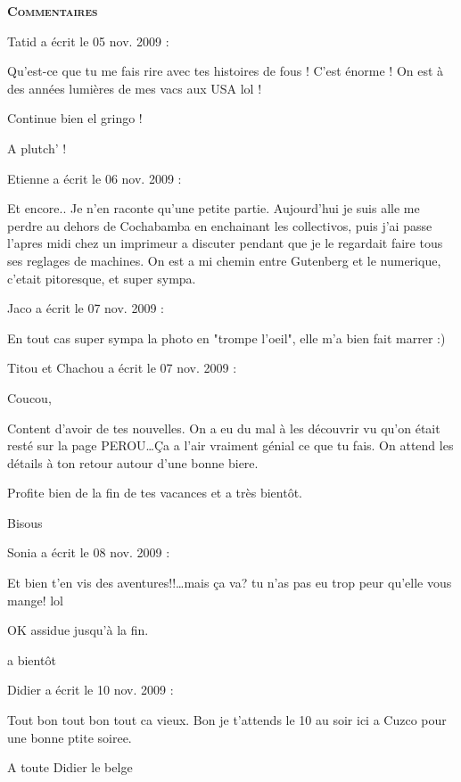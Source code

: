 \bigskip
\textbf{\textsc{Commentaires}}

\medskip
Tatid a écrit le 05 nov. 2009 :
\begin{displayquote}
Qu'est-ce que tu me fais rire avec tes histoires de fous ! C'est énorme ! On est à des années lumières de mes vacs aux USA lol !

Continue bien el gringo !

A plutch' !
\end{displayquote}

\medskip
Etienne a écrit le 06 nov. 2009 :
\begin{displayquote}
Et encore.. Je n'en raconte qu'une petite partie. Aujourd'hui je suis alle me perdre au dehors de Cochabamba en enchainant les collectivos, puis j'ai passe l'apres midi chez un imprimeur a discuter pendant que je le regardait faire tous ses reglages de machines. On est a mi chemin entre Gutenberg et le numerique, c'etait pitoresque, et super sympa.
\end{displayquote}

\medskip
Jaco a écrit le 07 nov. 2009 :
\begin{displayquote}
En tout cas super sympa la photo en "trompe l'oeil", elle m'a bien fait marrer :)
\end{displayquote}

\medskip
Titou et Chachou a écrit le 07 nov. 2009 :
\begin{displayquote}
Coucou,

Content d'avoir de tes nouvelles. On a eu du mal à les découvrir vu qu'on était resté sur la page PEROU\dots Ça a l'air vraiment génial ce que tu fais. On attend les détails à ton retour autour d'une bonne biere.

Profite bien de la fin de tes vacances et a très bientôt.

Bisous
\end{displayquote}

\medskip
Sonia a écrit le 08 nov. 2009 :
\begin{displayquote}
Et bien t'en vis des aventures!!\dots mais ça va? tu n'as pas eu trop peur qu'elle vous mange! lol

OK assidue jusqu'à la fin.

a bientôt
\end{displayquote}

\medskip
Didier a écrit le 10 nov. 2009 :
\begin{displayquote}
Tout bon tout bon tout ca vieux. Bon je t'attends le 10 au soir ici a Cuzco pour une bonne ptite soiree.

A toute
Didier le belge
\end{displayquote}

